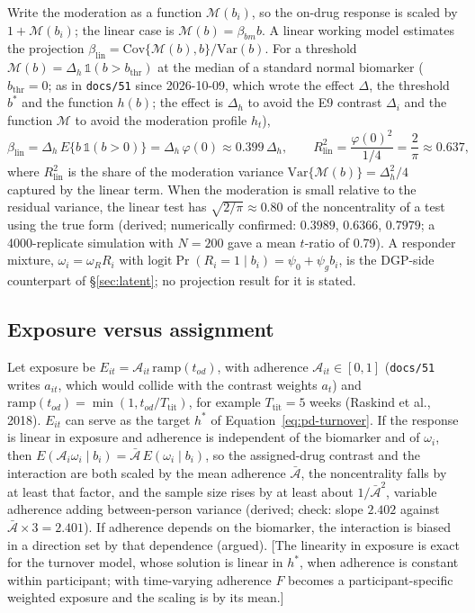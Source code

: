\documentclass[11pt]{article}
\newcommand{\note}[1]{\textcolor{blue!60!black}{\small [#1]}}
\newcommand{\code}[1]{\texttt{#1}}
\begin{document}
Write the moderation as a function $\mathcal M(b_i)$, so the on-drug response
is scaled by $1 + \mathcal M(b_i)$; the linear case is $\mathcal M(b) = \beta_{bm} b$.
A linear working model estimates the projection
$\beta_{\text{lin}} = \mathrm{Cov}\{\mathcal M(b), b\}/\mathrm{Var}(b)$. For a
threshold $\mathcal M(b) = \Delta_h\,\mathbb{1}(b > b_{\text{thr}})$ at the median of
a standard normal biomarker ($b_{\text{thr}} = 0$; as in \code{docs/51}
since 2026-10-09, which wrote the effect $\Delta$, the threshold
$b^{\ast}$ and the function $h(b)$; the effect is $\Delta_h$ to avoid
the E9 contrast $\Delta_i$ and the function $\mathcal M$ to avoid the
moderation profile $h_t$),
\begin{equation}
\beta_{\text{lin}} = \Delta_h\, E\{b\,\mathbb{1}(b>0)\} =
  \Delta_h\,\varphi(0) \approx 0.399\,\Delta_h, \qquad
R^2_{\text{lin}} = \frac{\varphi(0)^2}{1/4} = \frac{2}{\pi}
  \approx 0.637,
\label{eq:pd-threshold}
\end{equation}
where $R^2_{\text{lin}}$ is the share of the moderation variance
$\mathrm{Var}\{\mathcal M(b)\} = \Delta_h^2/4$ captured by the linear term.
When the moderation is small relative to the residual variance, the
linear test has $\sqrt{2/\pi} \approx 0.80$ of the noncentrality of a
test using the true form (derived; numerically confirmed:
$0.3989$, $0.6366$, $0.7979$; a 4000-replicate simulation with $N =
200$ gave a mean $t$-ratio of 0.79). A responder mixture,
$\omega_i = \omega_R R_i$ with $\mathrm{logit}\Pr(R_i = 1 \mid b_i) =
\psi_0 + \psi_g b_i$, is the DGP-side counterpart of
\S\ref{sec:latent}; no projection result for it is stated.

\subsection{Exposure versus assignment}

Let exposure be $E_{it} = \mathcal{A}_{it}\,\mathrm{ramp}(t_{od})$,
with adherence $\mathcal{A}_{it} \in [0,1]$ (\code{docs/51} writes
$a_{it}$, which would collide with the contrast weights $a_t$) and
$\mathrm{ramp}(t_{od}) = \min(1, t_{od}/T_{\text{tit}})$, for example
$T_{\text{tit}} = 5$ weeks (Raskind et al., 2018). $E_{it}$ can serve
as the target $h^{\ast}$ of Equation~\eqref{eq:pd-turnover}. If the
response is linear in exposure and adherence is independent of the
biomarker and of $\omega_i$, then
$E(\mathcal{A}_i\omega_i \mid b_i) = \bar{\mathcal{A}}\,E(\omega_i \mid
b_i)$, so the assigned-drug contrast and the interaction are both
scaled by the mean adherence $\bar{\mathcal{A}}$, the noncentrality
falls by at least that factor, and the sample size rises by at least
about $1/\bar{\mathcal{A}}^2$, variable adherence adding between-person
variance (derived; check: slope $2.402$ against $\bar{\mathcal{A}}
\times 3 = 2.401$). If adherence depends on the biomarker, the
interaction is biased in a direction set by that dependence (argued).
\note{The linearity in exposure is exact for the turnover model,
whose solution is linear in $h^{\ast}$, when adherence is constant
within participant; with time-varying adherence $F$ becomes a
participant-specific weighted exposure and the scaling is by its mean.}
\end{document}

